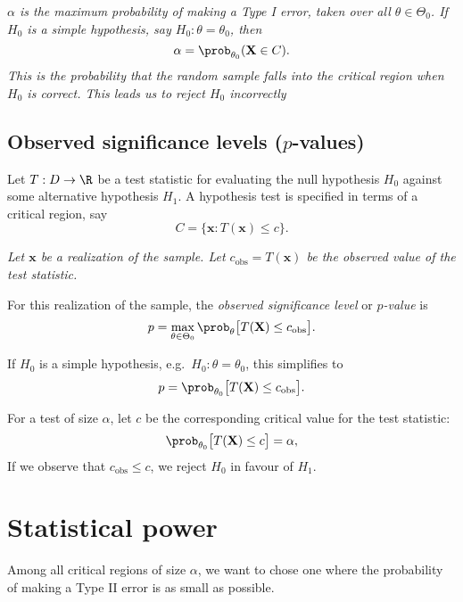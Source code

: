 \begin{remark}
\ben
\it $\alpha$ is the \emph{maximum} probability of making a Type I error, taken over all $\theta\in\Theta_0$.
\it If $H_0$ is a simple hypothesis, say $H_0:\theta=\theta_0$, then
\[
\alpha = \prob_{\theta_0}(\mathbf{X}\in C).
\]
This is the probability that the random sample falls into the critical region when $H_0$ is correct. This leads us to reject $H_0$ incorrectly
\een
\end{remark}


\subsection{Observed significance levels ($p$-values)}

Let $T:D\to\R$ be a test statistic for evaluating the null hypothesis $H_0$ against some alternative hypothesis $H_1$. A hypothesis test is specified in terms of a critical region, say
\[
C = \{\mathbf{x} : T(\mathbf{x}) \leq c\}.
\]

\bit
\it Let $\mathbf{x}$ be a realization of the sample.
\it Let $c_{\text{obs}} = T(\mathbf{x})$ be the observed value of the test statistic.
\eit

For this realization of the sample, the \emph{observed significance level} or \emph{$p$-value} is
\[
p = \max_{\theta\in\Theta_0} \prob_{\theta}\big[ T(\mathbf{X})\leq c_{\text{obs}}\big].
\]

If $H_0$ is a simple hypothesis, e.g.\ $H_0:\theta=\theta_0$, this simplifies to
\[
p = \prob_{\theta_0}\big[ T(\mathbf{X})\leq c_{\text{obs}}\big].
\]


\begin{remark}
For a test of size $\alpha$, let $c$ be the corresponding critical value for the test statistic:
\[
\prob_{\theta_0}\big[ T(\mathbf{X})\leq c \big] = \alpha,
\]
If we observe that $c_{\text{obs}}\leq c$, we reject $H_0$ in favour of $H_1$.
\end{remark}


\section{Statistical power} 
Among all critical regions of size $\alpha$, we want to chose one where the probability of making a Type II error is as small as possible.

